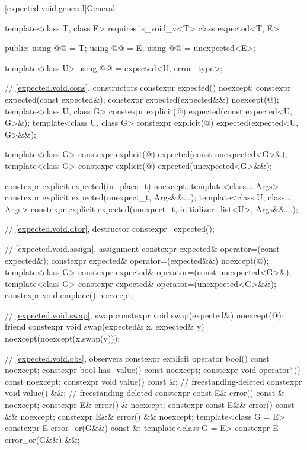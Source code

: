 [expected.void.general]{General}

\begin{codeblock}
template<class T, class E> requires is_void_v<T>
class expected<T, E> {
public:
  using @@ = T;
  using @@ = E;
  using @@ = unexpected<E>;

  template<class U>
  using @@ = expected<U, error_type>;

  // \ref{expected.void.cons}, constructors
  constexpr expected() noexcept;
  constexpr expected(const expected&);
  constexpr expected(expected&&) noexcept(@\seebelow@);
  template<class U, class G>
    constexpr explicit(@\seebelow@) expected(const expected<U, G>&);
  template<class U, class G>
    constexpr explicit(@\seebelow@) expected(expected<U, G>&&);

  template<class G>
    constexpr explicit(@\seebelow@) expected(const unexpected<G>&);
  template<class G>
    constexpr explicit(@\seebelow@) expected(unexpected<G>&&);

  constexpr explicit expected(in_place_t) noexcept;
  template<class... Args>
    constexpr explicit expected(unexpect_t, Args&&...);
  template<class U, class... Args>
    constexpr explicit expected(unexpect_t, initializer_list<U>, Args&&...);


  // \ref{expected.void.dtor}, destructor
  constexpr ~expected();

  // \ref{expected.void.assign}, assignment
  constexpr expected& operator=(const expected&);
  constexpr expected& operator=(expected&&) noexcept(@\seebelow@);
  template<class G>
    constexpr expected& operator=(const unexpected<G>&);
  template<class G>
    constexpr expected& operator=(unexpected<G>&&);
  constexpr void emplace() noexcept;

  // \ref{expected.void.swap}, swap
  constexpr void swap(expected&) noexcept(@\seebelow@);
  friend constexpr void swap(expected& x, expected& y) noexcept(noexcept(x.swap(y)));

  // \ref{expected.void.obs}, observers
  constexpr explicit operator bool() const noexcept;
  constexpr bool has_value() const noexcept;
  constexpr void operator*() const noexcept;
  constexpr void value() const &;                                           // freestanding-deleted
  constexpr void value() &&;                                                // freestanding-deleted
  constexpr const E& error() const & noexcept;
  constexpr E& error() & noexcept;
  constexpr const E&& error() const && noexcept;
  constexpr E&& error() && noexcept;
  template<class G = E> constexpr E error_or(G&&) const &;
  template<class G = E> constexpr E error_or(G&&) &&;

}
\end{codeblock}
